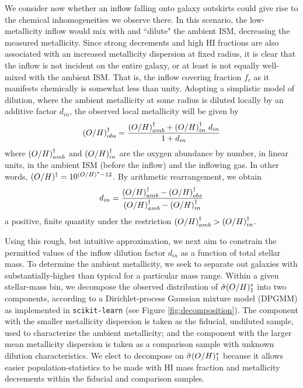 We consider now whether an inflow falling onto galaxy outskirts could give rise to the chemical inhomogeneities we observe there. In this scenario, the low-metallicity inflow would mix with and ``dilute" the ambient ISM, decreasing the measured metallicity. Since strong decrements and high HI fractions are also associated with an increased metallicity dispersion at fixed radius, it is clear that the inflow is not incident on the entire galaxy, or at least is not equally well-mixed with the ambient ISM. That is, the inflow covering fraction $f_c$ as it manifests chemically is somewhat less than unity. Adopting a simplistic model of dilution, where the ambient metallicity at some radius is diluted locally by an additive factor $d_{in}$, the observed local metallicity will be given by
%
\begin{equation}
    (O/H)^{\dagger}_{obs} = \frac{(O/H)^{\dagger}_{amb} + (O/H)^{\dagger}_{in} ~ d_{in}}{1 + d_{in}}
\end{equation}
%
where $(O/H)^{\dagger}_{amb}$ and $(O/H)^{\dagger}_{in}$ are the oxygen abundance by number, in linear units, in the ambient ISM (before the inflow) and the inflowing gas. In other words, $(O/H)^{\dagger} = 10^{(O/H)^* - 12}$.
%
By arithmetic rearrangement, we obtain
%
\begin{equation}
    d_{in} = \frac{(O/H)^{\dagger}_{amb} - (O/H)^{\dagger}_{obs}}{(O/H)^{\dagger}_{amb} - (O/H)^{\dagger}_{in}}
\end{equation}
%
a positive, finite quantity under the restriction $(O/H)^{\dagger}_{amb} > (O/H)^{\dagger}_{in}$.

Using this rough, but intuitive approximation, we next aim to constrain the permitted values of the inflow dilution factor $d_{in}$ as a function of total stellar mass. To determine the ambient metallicity, we seek to separate out galaxies with substantially-higher \metdisp than typical for a particular mass range. Within a given stellar-mass bin, we decompose the observed distribution of $\tilde{\sigma} (O/H)^*_1$ into two components, according to a Dirichlet-process Gaussian mixture model (DPGMM) as implemented in \texttt{scikit-learn} \citep{scikit-learn} (see Figure \ref{fig:decomposition}). The component with the smaller metallicity dispersion is taken as the fiducial, undiluted sample, used to characterize the ambient metallicity; and the component with the larger mean metallicity dispersion is taken as a comparison sample with unknown dilution characteristics. We elect to decompose on $\tilde{\sigma} (O/H)^*_1$ because it allows easier population-statistics to be made with HI mass fraction and metallicity decrements within the fiducial and comparison samples.

